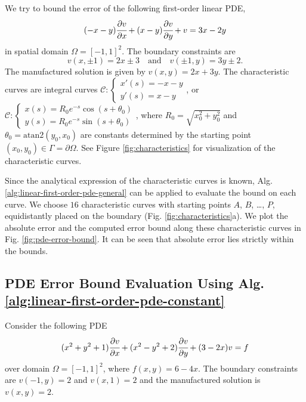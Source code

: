    We try to bound the error of the following first-order linear PDE,
    {
        \begin{equation} \label{eq:attractor}
            (-x -y) \cfrac{\partial v}{\partial x} + (x - y) \cfrac{\partial v}{\partial y} + v = 3x - 2 y
        \end{equation}
    }
    in spatial domain $\Omega=[-1, 1]^2$. 
    The boundary constraints are 
    \begin{equation}
        v(x, \pm1) =2x\pm 3 \quad \text{and} \quad v(\pm 1, y) = 3y \pm 2.
    \end{equation}
    The manufactured solution is given by $v(x, y) = 2x + 3y$.
    The characteristic curves are integral curves {$\mathcal{C}: \begin{cases*} x'(s) = -x - y \\[-0.25em] y'(s) = x - y \end{cases*}$}, or {$\mathcal{C}:\begin{cases*} x(s) = R_0 e^{-s} \cos (s+\theta_0)\\[-0.25em] y(s) = R_0 e^{-s} \sin(s + \theta_0) \end{cases*}$}, where $R_0 = \sqrt{x_0^2+y_0^2}$ and $\theta_0 = \mathrm{atan2}(y_0, x_0)$ are constants determined by the starting point $(x_0, y_0) \in \Gamma = \partial \Omega$.
    See Figure \ref{fig:characteristics} for visualization of the characteristic curves.

    Since the analytical expression of the characteristic curves is known, Alg. \ref{alg:linear-first-order-pde-general} can be applied to evaluate the bound on each curve. 
    We choose $16$ characteristic curves with starting points $A$, $B$, \dots, $P$, equidistantly placed on the boundary (Fig. \ref{fig:characteristics}a). 
    We plot the absolute error and the computed error bound along these characteristic curves in Fig. \ref{fig:pde-error-bound}.
    It can be seen that absolute error lies strictly within the bounds.
\subsection{PDE Error Bound Evaluation Using Alg. \ref{alg:linear-first-order-pde-constant}}
    Consider the following PDE 
    {
        \begin{equation}\label{eq:hard-to-solve-characteristics}
            (x^2+y^2+1)\cfrac{\partial v}{\partial x} + (x^2-y^2+2)\cfrac{\partial v}{\partial y} + (3-2x)v = f
        \end{equation}
    }
    over domain $\Omega = [-1, 1]^2$, where $f(x, y) = 6-4x$.
    The boundary constraints are $v(-1, y) = 2$ and $v(x, 1) = 2$ and the manufactured solution is $v(x, y) = 2$.
    

